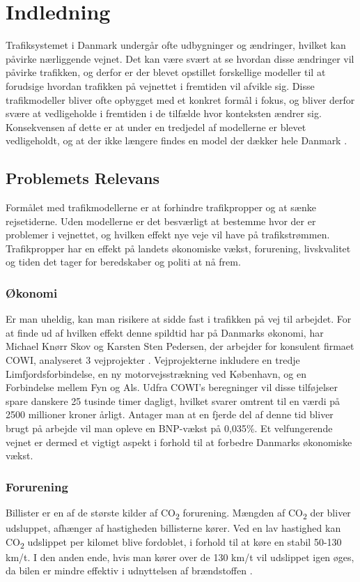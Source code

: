 \chapter{Indledning}\label{Indledning}
Trafiksystemet i Danmark undergår ofte udbygninger og ændringer, hvilket kan påvirke nærliggende vejnet. Det kan være svært at se hvordan disse ændringer vil påvirke trafikken, og derfor er der blevet opstillet forskellige modeller til at forudsige hvordan trafikken på vejnettet i fremtiden vil afvikle sig. Disse trafikmodeller bliver ofte opbygget med et konkret formål i fokus, og bliver derfor svære at vedligeholde i fremtiden i de tilfælde hvor konteksten ændrer sig. Konsekvensen af dette er at under en tredjedel af modellerne er blevet vedligeholdt, og at der ikke længere findes en model der dækker hele Danmark \cite[s. 1-2]{dtfnotat}.
\section{Problemets Relevans}
Formålet med trafikmodellerne er at forhindre trafikpropper og at sænke rejsetiderne. Uden modellerne er det besværligt at bestemme hvor der er problemer i vejnettet, og hvilken effekt nye veje vil have på trafikstrømmen. Trafikpropper har en effekt på landets økonomiske vækst, forurening, livskvalitet og tiden det tager for beredskaber og politi at nå frem.

\subsection{Økonomi}
Er man uheldig, kan man risikere at sidde fast i trafikken på vej til arbejdet. For at finde ud af hvilken effekt denne spildtid har på Danmarks økonomi, har Michael Knørr Skov og Karsten Sten Pedersen, der arbejder for konsulent firmaet COWI, analyseret 3 vejprojekter \cite{trafikoekonomi}. Vejprojekterne inkludere en tredje Limfjordsforbindelse, en ny motorvejsstrækning ved København, og en Forbindelse mellem Fyn og Als. Udfra COWI’s beregninger vil disse tilføjelser spare danskere 25 tusinde timer dagligt, hvilket svarer omtrent til en værdi på 2500 millioner kroner årligt. Antager man at en fjerde del af denne tid bliver brugt på arbejde vil man opleve en BNP-vækst på 0,035\%. Et velfungerende vejnet er dermed et vigtigt aspekt i forhold til at forbedre Danmarks økonomiske vækst.

\subsection{Forurening}
Billister er en af de største kilder af CO\textsubscript{2} forurening. Mængden af CO\textsubscript{2} der bliver udsluppet, afhænger af hastigheden billisterne kører. Ved en lav hastighed kan CO\textsubscript{2} udslippet per kilomet blive fordoblet, i forhold til at køre en stabil 50-130 km/t. I den anden ende, hvis man kører over de 130 km/t vil udslippet igen øges, da bilen er mindre effektiv i udnyttelsen af brændstoffen \cite[s. 5-6]{forurening}.

